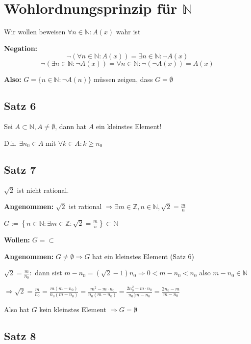 \documentclass[fleqn]{scrbook}
\newcommand{\N}{\mathbb{N}}
\begin{document}
\section{Wohlordnungsprinzip für \texorpdfstring{$\N$}{N}}

Wir wollen beweisen $\forall n \in \N: A(x)$ wahr ist

\textbf{Negation:}
\[\lnot(\forall n \in \N: A(x))=\exists n \in \N: \lnot A(x)\]
\[\lnot(\exists n \in \N: \lnot A(x))=\forall n \in \N: \lnot(\lnot A(x)) = A(x)\]

\textbf{Also:} $G=\{n\in \N: \lnot A(n)\}$ müssen zeigen, dass $G=\emptyset$

\subsection{Satz 6}

Sei $A \subset \N, A \neq \emptyset$, dann hat $A$ ein kleinstes Element!

D.h. $\exists n_0 \in A$ mit $\forall k \in A: k \geq n_0$

\subsection{Satz 7}

$\sqrt{2}$ ist nicht rational.

\textbf{Angenommen:} $\sqrt{2}$ ist rational $\Longrightarrow \exists m \in \mathbb{Z}, n \in \N, \sqrt{2}=\frac{m}{n}$

$G:=\left\{ n \in \N: \exists m \in \mathbb{Z}: \sqrt{2} = \frac{m}{n} \right\} \subset \N$

\textbf{Wollen:} $G=\subset$

\textbf{Angenommen:} $G \neq \emptyset \Longrightarrow G$ hat ein kleinstes Element (Satz 6)

$\sqrt{2}=\frac{m}{n_0}:$ dann sist $m-n_0 = (\sqrt{2}-1)n_0 \Longrightarrow 0<m-n_0<n_0$ also $m-n_0 \in \N$

$\Longrightarrow \sqrt{2} = \frac{m}{n_0} = \frac{m(m-n_0)}{n_0(m-n_0)} = \frac{m^2-m \cdot n_0}{n_0(m-n_0)} = \frac{2n_0^2-m \cdot n_0}{n_0(m-n_0} = \frac{2n_0-m}{m-n_0}$

Also hat $G$ kein kleinstes Element $\Longrightarrow G = \emptyset$ 

\subsection{Satz 8}
\end{document}
